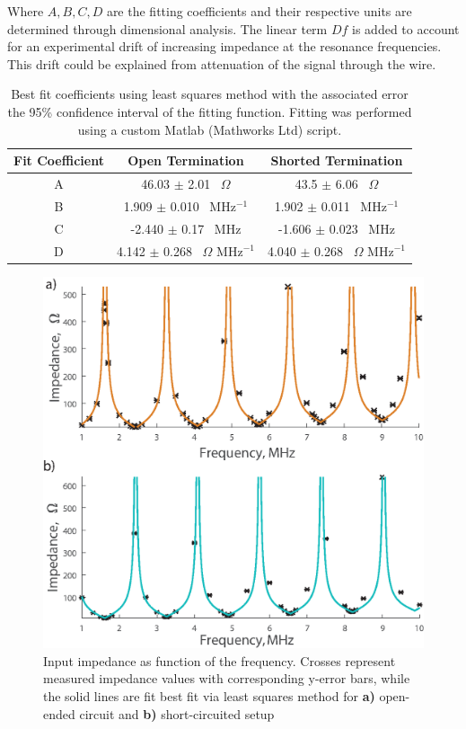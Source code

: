 Where $A,B,C,D$ are the fitting coefficients and their respective units are determined through dimensional analysis. The linear term $Df$ is added to account for an experimental drift of increasing impedance at the resonance frequencies. This drift could be explained from attenuation of the signal through the wire.\\

\begin{table}[H]
    \centering
    \begin{tabular}{c|c|c}
        \textbf{Fit Coefficient} &  \textbf{Open Termination} & \textbf{Shorted Termination} \\ \midrule
        A & 46.03 $\pm$ 2.01 \ $\Omega$ & 43.5 $\pm$ 6.06 \ $\Omega$\\
        B & 1.909 $\pm$ 0.010 \ MHz$^{-1}$ & 1.902 $\pm$ 0.011 \ MHz$^{-1}$ \\
        C & -2.440 $\pm$ 0.17 \ MHz & -1.606 $\pm$ 0.023 \ MHz \\
        D & 4.142 $\pm$ 0.268 \ $\Omega$ MHz$^{-1}$ & 4.040 $\pm$ 0.268 \ $\Omega$ MHz$^{-1}$
    \end{tabular}
    \caption{Best fit coefficients using least squares method with the associated error the 95\% confidence interval of the fitting function. Fitting was performed using a custom Matlab (Mathworks Ltd) script.}
    \label{CoefficientsTable}
\end{table}

\begin{figure}[H]
    \centering
    \includegraphics[width=\textwidth]{figures/Fit_V3.eps}
    \caption{Input impedance as function of the frequency. Crosses represent measured impedance values with corresponding y-error bars, while the solid lines are fit best fit via least squares method for \textbf{a)} open-ended circuit and \textbf{b)} short-circuited setup}
    \label{Zin_plot}
\end{figure}


